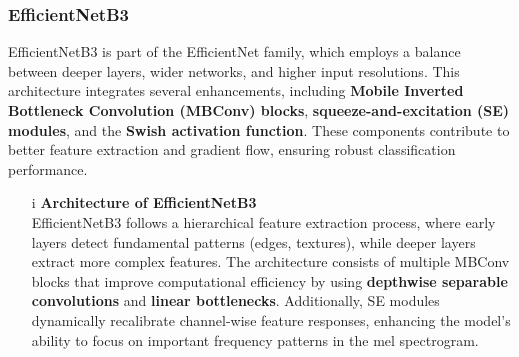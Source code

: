       \subsubsection{EfficientNetB3}
      EfficientNetB3 is part of the EfficientNet family, which employs a balance between deeper layers, wider networks, and higher input resolutions. This architecture integrates several enhancements, including \textbf{Mobile Inverted Bottleneck Convolution (MBConv) blocks}, \textbf{squeeze-and-excitation (SE) modules}, and the \textbf{Swish activation function}. These components contribute to better feature extraction and gradient flow, ensuring robust classification performance.
      \begin{itemize}
            \item[i] \textbf{Architecture of EfficientNetB3} \\
            EfficientNetB3 follows a hierarchical feature extraction process, where early layers detect fundamental patterns (edges, textures), while deeper layers extract more complex features. The architecture consists of multiple MBConv blocks that improve computational efficiency by using \textbf{depthwise separable convolutions} and \textbf{linear bottlenecks}. Additionally, SE modules dynamically recalibrate channel-wise feature responses, enhancing the model’s ability to focus on important frequency patterns in the mel spectrogram.
            

\end{itemize}
